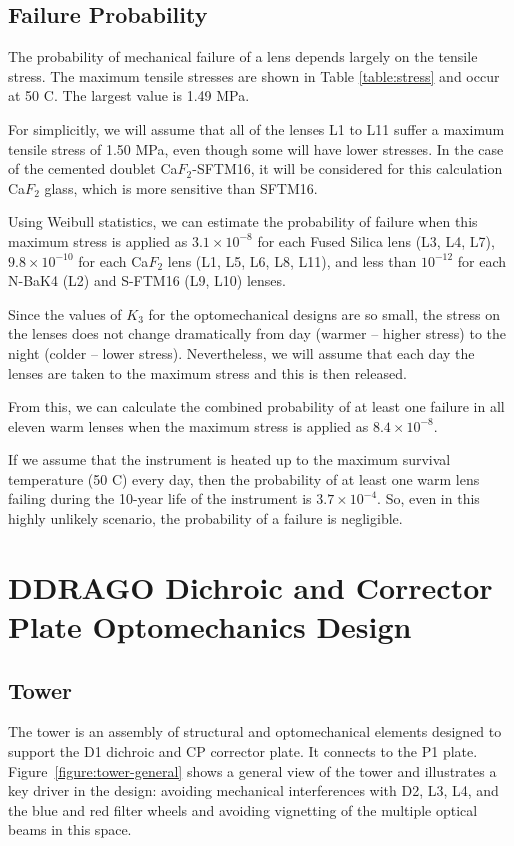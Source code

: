 \documentclass{report}
\begin{document}
\section{Failure Probability}\label{secFailProb}

The probability of mechanical failure of a lens depends largely on the tensile stress. The maximum tensile stresses are shown in Table \ref{table:stress} and occur at 50 C. The largest value is 1.49 MPa.

For simplicitly, we will assume that all of the lenses L1 to L11 suffer a maximum tensile stress of 1.50 MPa, even though some will have lower stresses. 
In the case of the cemented doublet Ca$F_2$-SFTM16, it will be considered for this calculation Ca$F_2$ glass, which is more sensitive than SFTM16.

Using Weibull statistics, we can estimate the probability of failure when this maximum stress is applied as $3.1 \times 10^{-8}$ for each Fused Silica lens (L3, L4, L7), $9.8\times 10^{-10}$ for each Ca$F_2$ lens (L1, L5, L6, L8, L11), and less than $10^{-12}$ for each N-BaK4 (L2) and S-FTM16 (L9, L10) lenses.

Since the values of $K_3$ for the optomechanical designs are so small, the stress on the lenses does not change dramatically from day (warmer – higher stress) to the night (colder – lower stress). Nevertheless, we will assume that each day the lenses are taken to the maximum stress and this is then released.

From this, we can calculate the combined probability of at least one failure in all eleven warm lenses when the maximum stress is applied as $8.4 \times 10^{-8}$.

If we assume that the instrument is heated up to the maximum survival temperature (50 C) every day, then the probability of at least one warm lens failing during the 10-year life of the instrument is $3.7\times 10^{-4}$. So, even in this highly unlikely scenario, the probability of a failure is negligible.

\chapter{DDRAGO Dichroic and Corrector Plate Optomechanics Design}

\section{Tower}

The tower is an assembly of structural and optomechanical elements designed to support the D1 dichroic and CP corrector plate. It connects to the P1 plate. Figure~\ref{figure:tower-general} shows a general view of the tower and illustrates a key driver in the design: avoiding mechanical interferences with D2, L3, L4, and the blue and red filter wheels and avoiding vignetting of the multiple optical beams in this space.
\end{document}
